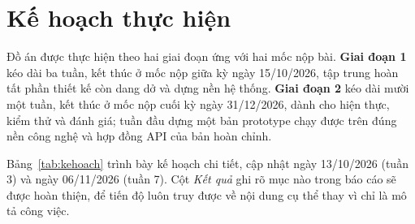 \chapter*{Kế hoạch thực hiện}
\label{chap:kehoach}

Đồ án được thực hiện theo hai giai đoạn ứng với hai mốc nộp bài. \textbf{Giai đoạn 1} kéo dài ba tuần, kết thúc ở mốc nộp giữa kỳ ngày 15/10/2026, tập trung hoàn tất phần thiết kế còn dang dở và dựng nền hệ thống. \textbf{Giai đoạn 2} kéo dài mười một tuần, kết thúc ở mốc nộp cuối kỳ ngày 31/12/2026, dành cho hiện thực, kiểm thử và đánh giá; tuần đầu dựng một bản prototype chạy được trên đúng nền công nghệ và hợp đồng API của bản hoàn chỉnh.

Bảng~\ref{tab:kehoach} trình bày kế hoạch chi tiết, cập nhật ngày 13/10/2026 (tuần 3) và ngày 06/11/2026 (tuần 7). Cột \emph{Kết quả} ghi rõ mục nào trong báo cáo sẽ được hoàn thiện, để tiến độ luôn truy được về nội dung cụ thể thay vì chỉ là mô tả công việc.

